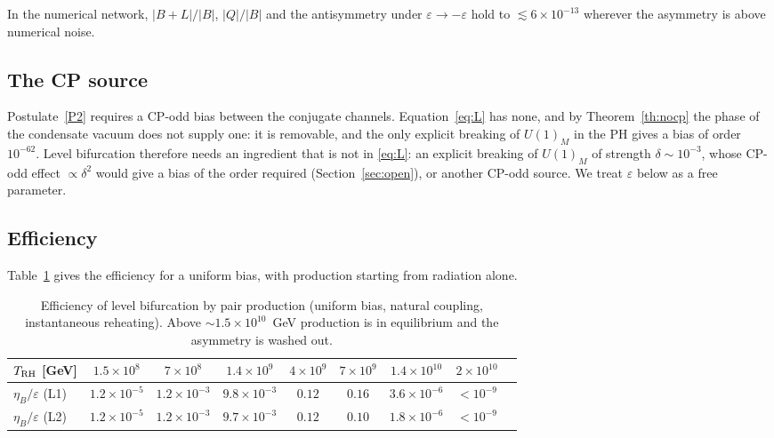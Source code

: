 \documentclass[11pt]{article}
\newcommand{\TRH}{T_{\rm RH}}
\begin{document}
\noindent In the numerical network, $|B+L|/|B|$, $|Q|/|B|$ and the antisymmetry under $\varepsilon\to-\varepsilon$ hold to $\lesssim6\times10^{-13}$ wherever the asymmetry is above numerical noise.

\subsection{The CP source}

Postulate~\ref{P2} requires a CP-odd bias between the conjugate channels. Equation~\eqref{eq:L} has none, and by Theorem~\ref{th:nocp} the phase of the condensate vacuum does not supply one: it is removable, and the only explicit breaking of $U(1)_M$ in the PH gives a bias of order $10^{-62}$. Level bifurcation therefore needs an ingredient that is not in \eqref{eq:L}: an explicit breaking of $U(1)_M$ of strength $\delta\sim10^{-3}$, whose CP-odd effect $\propto\delta^2$ would give a bias of the order required (Section~\ref{sec:open}), or another CP-odd source. We treat $\varepsilon$ below as a free parameter.

\subsection{Efficiency}

Table~\ref{tab:eff} gives the efficiency for a uniform bias, with production starting from radiation alone.

\begin{table}[h]
\centering
\begin{tabular}{lcccccccc}
\toprule
$\TRH$ [GeV] & $1.5\times10^{8}$ & $7\times10^{8}$ & $1.4\times10^{9}$ & $4\times10^{9}$ & $7\times10^{9}$ & $1.4\times10^{10}$ & $2\times10^{10}$ \\
\midrule
$\eta_B/\varepsilon$ (L1) & $1.2\times10^{-5}$ & $1.2\times10^{-3}$ & $9.8\times10^{-3}$ & $0.12$ & $0.16$ & $3.6\times10^{-6}$ & $<10^{-9}$ \\
$\eta_B/\varepsilon$ (L2) & $1.2\times10^{-5}$ & $1.2\times10^{-3}$ & $9.7\times10^{-3}$ & $0.12$ & $0.10$ & $1.8\times10^{-6}$ & $<10^{-9}$ \\
\bottomrule
\end{tabular}
\caption{Efficiency of level bifurcation by pair production (uniform bias, natural coupling, instantaneous reheating). Above $\sim1.5\times10^{10}$~GeV production is in equilibrium and the asymmetry is washed out.}\label{tab:eff}
\end{table}
\end{document}
